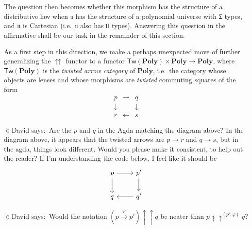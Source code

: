 \documentclass[
  11pt,
  oneside,
  article]{memoir}
\theoremstyle{definition}
\theoremstyle{plain}
\newcommand{\Cat}[1]{\mathbf{#1}}%
\newcommand{\To}[2][]{\xrightarrow[#1]{#2}}
\newcommand{\poly}{\Cat{Poly}}
\newcommand{\0}{\textsf{0}}
\newcommand{\1}{\tn{\textsf{1}}}
\newcommand{\dnote}[1]{{\quad \color{blue}$\lozenge$\;David says:}~#1\;{\color{blue}$\lozenge$}\quad}
\begin{document}
The question then becomes whether this morphism has the structure of a
distributive law when \texttt{𝔲} has the structure of a polynomial
universe with \texttt{Σ} types, and \texttt{π} is Cartesian
(i.e.~\texttt{𝔲} also has \texttt{Π} types). Answering this question in
the affirmative shall be our task in the remainder of this section.

As a first step in this direction, we make a perhaps unexpected move of
further generalizing the \(\upuparrows\) functor to a functor
\(\mathsf{Tw}(\poly) \times \poly \to \poly\),
where \(\mathsf{Tw}(\poly)\) is the \emph{twisted arrow
category} of \(\poly\), i.e.~the category whose objects are
lenses and whose morphisms are \emph{twisted} commuting squares of the
form \[
\begin{array}{ccc}
p & \to & q\\
\downarrow & & \downarrow\\
r & \leftarrow & s
\end{array}
\]

\dnote{Are the $p$ and $q$ in the Agda matching the diagram above? In the diagram above, it appears that the twisted arrows are $p\to r$ and $q\to s$, but in the agda, things look different. Would you please make it consistent, to help out the reader? If I'm understanding the code below, I feel like it should be
\[
\begin{tikzcd}[ampersand replacement=\&]
	p\ar[r]\ar[d]\&p'\ar[d]\\
	q\&q'\ar[l]
\end{tikzcd}
\]}

\dnote{Would the notation $(p\To\varphi p')\uparrow\uparrow q$ be neater than $p\uparrow\uparrow^{(p',\varphi)}q$?}
\end{document}

